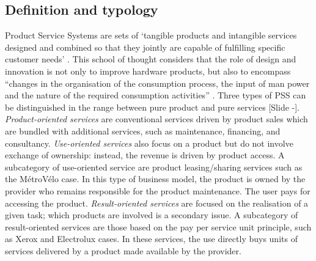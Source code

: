 \documentclass{article}
\newcounter{slide}
\begin{document}
\subsection{Definition and typology}
\label{sec:pssDefinition}
Product Service Systems are sets of ‘tangible products and intangible services designed and combined so that they jointly are capable of fulfilling specific customer needs’ \cite{tukkerEightTypesProduct2004}. This school of thought considers that the role of design and innovation is not only to improve hardware products, but also to encompass ``changes in the organisation of the consumption process, the input of man power and the nature of the required consumption activities'' \cite{meijkampChangingConsumerBehaviour1999}. Three types of PSS can be distinguished in the range between pure product and pure services {\color{blue}[Slide -]}. \emph{Product-oriented services} are conventional services driven by product sales which are bundled with additional services, such as maintenance, financing, and consultancy. \emph{Use-oriented services} also focus on a product but do not involve exchange of ownership: instead, the revenue is driven by product access. A subcategory of use-oriented service are product leasing/sharing services such as the MétroVélo case. In this type of business model, the product is owned by the provider who remains responsible for the product maintenance. The user pays for accessing the product. \emph{Result-oriented services} are focused on the realisation of a given task; which products are involved is a secondary issue. A subcategory of result-oriented services are those based on the pay per service unit principle, such as Xerox and Electrolux cases. In these services, the use directly buys units of services delivered by a product made available by the provider.
\end{document}
